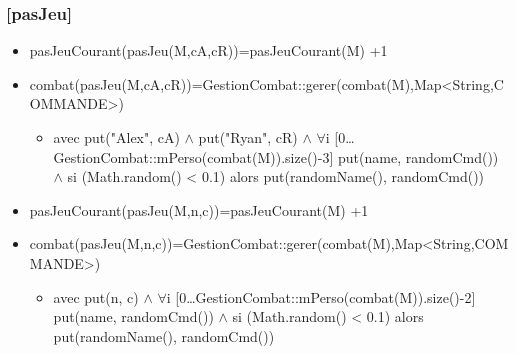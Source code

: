 \documentclass[11pt]{article}
\begin{document}
\subsubsection{[pasJeu]}
\label{sec-1.7.3}

\begin{itemize}

\item pasJeuCourant(pasJeu(M,cA,cR))=pasJeuCourant(M) +1\\
\label{sec-1.7.3.1}


\item combat(pasJeu(M,cA,cR))=GestionCombat::gerer(combat(M),Map<String,COMMANDE>)\\
\label{sec-1.7.3.2}

\begin{itemize}

\item avec put("Alex", cA) $\wedge$ put("Ryan", cR) $\wedge$ $\forall$i [0\ldots{}GestionCombat::mPerso(combat(M)).size()-3] put(name, randomCmd()) $\wedge$ si (Math.random() < 0.1) alors put(randomName(), randomCmd())\\
\label{sec-1.7.3.2.1}


\end{itemize} %

\item pasJeuCourant(pasJeu(M,n,c))=pasJeuCourant(M) +1\\
\label{sec-1.7.3.3}


\item combat(pasJeu(M,n,c))=GestionCombat::gerer(combat(M),Map<String,COMMANDE>)\\
\label{sec-1.7.3.4}

\begin{itemize}

\item avec put(n, c) $\wedge$ $\forall$i [0\ldots{}GestionCombat::mPerso(combat(M)).size()-2] put(name, randomCmd()) $\wedge$ si (Math.random() < 0.1) alors put(randomName(), randomCmd())\\
\label{sec-1.7.3.4.1}

\end{itemize} %
\end{itemize} %
\end{document}
